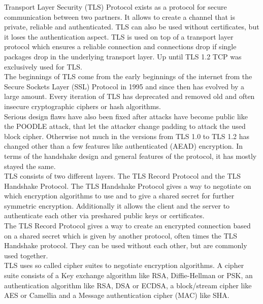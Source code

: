 \documentclass[a4paper,conference]{IEEEtran}
\begin{document}
Transport Layer Security (TLS) Protocol exists as a protocol for secure communication between two partners. It allows to create a channel that is private, reliable and authenticated\cite{rfc5246}.
TLS can also be used without certificates, but it loses the authentication aspect.
TLS is used on top of a transport layer protocol which ensures a reliable connection and connections drop if single packages drop in the underlying transport layer. Up until TLS 1.2 TCP was exclusively used for TLS.\\
The beginnings of TLS come from the early beginnings of the internet from the Secure Sockets Layer (SSL) Protocol in 1995\cite{Hickman1995} and since then has evolved by a large amount. Every iteration of TLS has deprecated and removed old and often insecure cryptographic ciphers or hash algorithms.\\
Serious design flaws have also been fixed after attacks have become public like the POODLE attack\cite{CVE-2014-3566}, that let the attacker change padding to attack the used block cipher. Otherwise not much in the versions from TLS 1.0 to TLS 1.2 has changed other than a few features like authenticated (AEAD) encryption.
In terms of the handshake design and general features of the protocol, it has mostly stayed the same.\\
TLS consists of two different layers. The TLS Record Protocol and the TLS Handshake Protocol.
The TLS Handshake Protocol gives a way to negotiate on which encryption algorithms to use and to give a shared secret for further symmetric encryption. Additionally it allows the client and the server to authenticate each other via preshared public keys or certificates.\\
The TLS Record Protocol gives a way to create an encrypted connection based on a shared secret which is given by another protocol, often times the TLS Handshake protocol.\cite{rfc5246}
They can be used without each other, but are commonly used together.\\
TLS uses so called cipher suites to negotiate encryption algorithms. A cipher suite consists of a Key exchange algorithm like RSA, Diffie-Hellman or PSK, an authentication algorithm like RSA, DSA or ECDSA, a block/stream cipher like AES or Camellia and a Message authentication cipher (MAC) like SHA.
\end{document}
